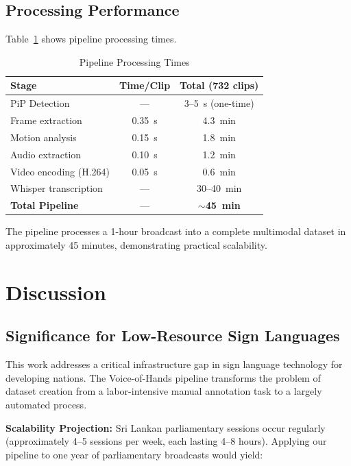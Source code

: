 \documentclass[journal]{IEEEtran}
\begin{document}
\subsection{Processing Performance}

Table~\ref{tab:processing} shows pipeline processing times.

\begin{table}[htbp]
\centering
\caption{Pipeline Processing Times}
\label{tab:processing}
\begin{tabular}{@{}lcc@{}}
\toprule
\textbf{Stage} & \textbf{Time/Clip} & \textbf{Total (732 clips)} \\ \midrule
PiP Detection & --- & 3--5~s (one-time) \\
Frame extraction & 0.35~s & 4.3~min \\
Motion analysis & 0.15~s & 1.8~min \\
Audio extraction & 0.10~s & 1.2~min \\
Video encoding (H.264) & 0.05~s & 0.6~min \\
Whisper transcription & --- & 30--40~min \\
\textbf{Total Pipeline} & --- & \textbf{$\sim$45~min} \\
\bottomrule
\end{tabular}
\end{table}

The pipeline processes a 1-hour broadcast into a complete multimodal dataset in approximately 45 minutes, demonstrating practical scalability.

\section{Discussion}
\label{sec:discussion}

\subsection{Significance for Low-Resource Sign Languages}

This work addresses a critical infrastructure gap in sign language technology for developing nations. The Voice-of-Hands pipeline transforms the problem of dataset creation from a labor-intensive manual annotation task to a largely automated process.

\textbf{Scalability Projection:} Sri Lankan parliamentary sessions occur regularly (approximately 4--5 sessions per week, each lasting 4--8 hours). Applying our pipeline to one year of parliamentary broadcasts would yield:
\end{document}
